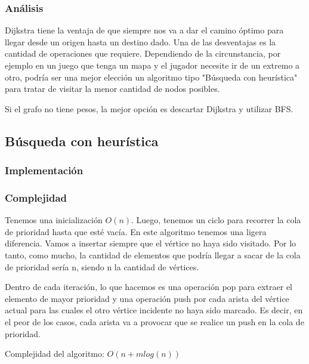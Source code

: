 \subsubsection{Análisis}
Dijkstra tiene la ventaja de que siempre nos va a dar el camino óptimo para llegar desde un origen hasta un destino dado. Una de las desventajas es la cantidad de operaciones que requiere. Dependiendo de la circunstancia, por ejemplo en un juego que tenga un mapa y el jugador necesite ir de un extremo a otro, podría ser una mejor elección un algoritmo tipo "Búsqueda con heurística" para tratar de visitar la menor cantidad de nodos posibles.

Si el grafo no tiene pesos, la mejor opción es descartar Dijkstra y utilizar BFS.

\newpage

\subsection{Búsqueda con heurística}
\subsubsection{Implementación}

\subsubsection{Complejidad}

Tenemos una inicialización $O(n)$. Luego, tenemos un ciclo para recorrer la cola de prioridad hasta que esté vacía. En este algoritmo tenemos una ligera diferencia. Vamos a insertar siempre que el vértice no haya sido visitado. Por lo tanto, como mucho, la cantidad de elementos que podría llegar a sacar de la cola de prioridad sería n, siendo n la cantidad de vértices.

Dentro de cada iteración, lo que hacemos es una operación pop para extraer el elemento de mayor prioridad y una operación push por cada arista del vértice actual para las cuales el otro vértice incidente no haya sido marcado. Es decir, en el peor de los casos, cada arista va a provocar que se realice un push en la cola de prioridad.

Complejidad del algoritmo: $O(n + mlog(n))$
